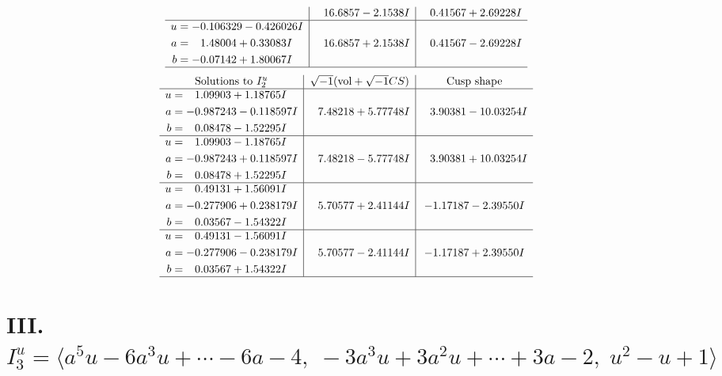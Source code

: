 \documentclass[1p]{elsarticle_modified}
\theoremstyle{definition}
\newcommand{\I}{\sqrt{-1}}
\begin{document}
$$\begin{array}{c|c|c}
 & \phantom{-}16.6857 - 2.1538 I & \phantom{-}0.41567 + 2.69228 I \\ \hline\begin{aligned}
u &= -0.106329 - 0.426026 I \\
a &= \phantom{-}1.48004 + 0.33083 I \\
b &= -0.07142 + 1.80067 I\end{aligned}
 & \phantom{-}16.6857 + 2.1538 I & \phantom{-}0.41567 - 2.69228 I\\
 \hline 
 \end{array}$$\newpage$$\begin{array}{c|c|c}  
\text{Solutions to }I^u_{2}& \I (\text{vol} + \sqrt{-1}CS) & \text{Cusp shape}\\
 \hline 
\begin{aligned}
u &= \phantom{-}1.09903 + 1.18765 I \\
a &= -0.987243 - 0.118597 I \\
b &= \phantom{-}0.08478 - 1.52295 I\end{aligned}
 & \phantom{-}7.48218 + 5.77748 I & \phantom{-}3.90381 - 10.03254 I \\ \hline\begin{aligned}
u &= \phantom{-}1.09903 - 1.18765 I \\
a &= -0.987243 + 0.118597 I \\
b &= \phantom{-}0.08478 + 1.52295 I\end{aligned}
 & \phantom{-}7.48218 - 5.77748 I & \phantom{-}3.90381 + 10.03254 I \\ \hline\begin{aligned}
u &= \phantom{-}0.49131 + 1.56091 I \\
a &= -0.277906 + 0.238179 I \\
b &= \phantom{-}0.03567 - 1.54322 I\end{aligned}
 & \phantom{-}5.70577 + 2.41144 I & -1.17187 - 2.39550 I \\ \hline\begin{aligned}
u &= \phantom{-}0.49131 - 1.56091 I \\
a &= -0.277906 - 0.238179 I \\
b &= \phantom{-}0.03567 + 1.54322 I\end{aligned}
 & \phantom{-}5.70577 - 2.41144 I & -1.17187 + 2.39550 I\\
 \hline 
 \end{array}$$\newpage\newpage\renewcommand{\arraystretch}{1}
\centering \section*{III. $I^u_{3}= \langle a^5 u-6 a^3 u+\cdots-6 a-4,\;-3 a^3 u+3 a^2 u+\cdots+3 a-2,\;u^2- u+1 \rangle$}
\end{document}
